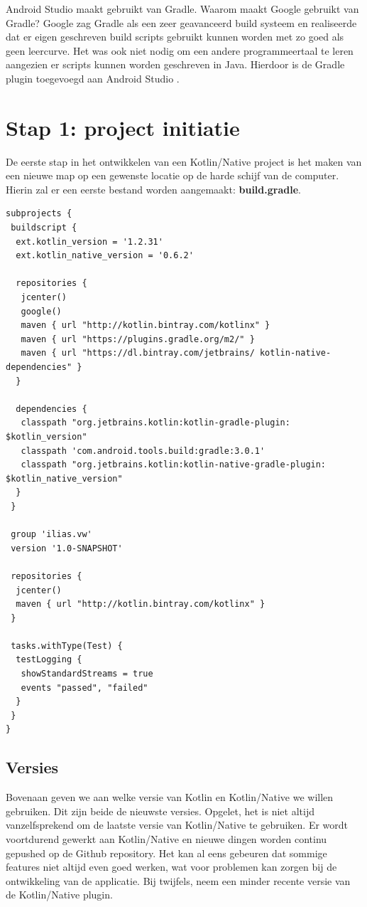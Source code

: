 Android Studio maakt gebruikt van Gradle. Waarom maakt Google gebruikt van Gradle? Google zag Gradle als een zeer geavanceerd build systeem en realiseerde dat er eigen geschreven build scripts gebruikt kunnen worden met zo goed als geen leercurve. Het was ook niet nodig om een andere programmeertaal te leren aangezien er scripts kunnen worden geschreven in Java. Hierdoor is de Gradle plugin toegevoegd aan Android Studio \autocite{GoogleGradle}.

\section{Stap 1: project initiatie}
De eerste stap in het ontwikkelen van een Kotlin/Native project is het maken van een nieuwe map op een gewenste locatie op de harde schijf van de computer. Hierin zal er een eerste bestand worden aangemaakt: \textbf{build.gradle}.

\begin{lstlisting}
subprojects {
 buildscript {
  ext.kotlin_version = '1.2.31'
  ext.kotlin_native_version = '0.6.2'
		
  repositories {
   jcenter()
   google()
   maven { url "http://kotlin.bintray.com/kotlinx" }
   maven { url "https://plugins.gradle.org/m2/" }
   maven { url "https://dl.bintray.com/jetbrains/ kotlin-native-dependencies" }
  }

  dependencies {
   classpath "org.jetbrains.kotlin:kotlin-gradle-plugin: $kotlin_version"
   classpath 'com.android.tools.build:gradle:3.0.1'
   classpath "org.jetbrains.kotlin:kotlin-native-gradle-plugin: $kotlin_native_version"
  }
 }
	
 group 'ilias.vw'
 version '1.0-SNAPSHOT'
	
 repositories {
  jcenter()
  maven { url "http://kotlin.bintray.com/kotlinx" }
 }
	
 tasks.withType(Test) {
  testLogging {
   showStandardStreams = true
   events "passed", "failed"
  }
 }
}
\end{lstlisting}
\subsection{Versies}
Bovenaan geven we aan welke versie van Kotlin en Kotlin/Native we willen gebruiken. Dit zijn beide de nieuwste versies. Opgelet, het is niet altijd vanzelfsprekend om de laatste versie van Kotlin/Native te gebruiken. Er wordt voortdurend gewerkt aan Kotlin/Native en nieuwe dingen worden continu gepushed op de Github repository. Het kan al eens gebeuren dat sommige features niet altijd even goed werken, wat voor problemen kan zorgen bij de ontwikkeling van de applicatie. Bij twijfels, neem een minder recente versie van de Kotlin/Native plugin.

